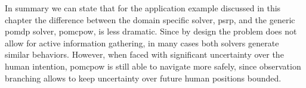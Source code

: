 In summary we can state that for the application example discussed in this
chapter the difference between the domain specific solver, \ac{psrp}, and the
generic \ac{pomdp} solver, \ac{pomcpow}, is less dramatic. Since by design the
problem does not allow for active information gathering, in many cases both
solvers generate similar behaviors. However, when faced with significant
uncertainty over the human intention, \ac{pomcpow} is still able to navigate
more safely, since observation branching allows to keep uncertainty over future
human positions bounded.

%  
%  
%  
%  
